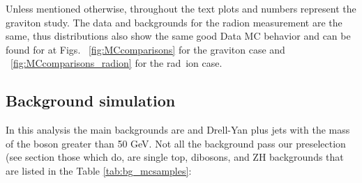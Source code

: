 Unless mentioned otherwise, throughout the text plots and numbers represent the graviton study. The data and backgrounds for the radion measurement are the same, thus distributions also show the same good Data MC behavior and can be found for at Figs. ~\ref{fig:MCcomparisons} for the graviton case and ~\ref{fig:MCcomparisons_radion} for the rad\
ion case.


\subsection{Background simulation\label{sec:bkgMC}}

In this analysis the main backgrounds are \ttbar and Drell-Yan plus
jets with the mass of the boson greater than 50 GeV. Not all the
background pass our preselection (see section %
those which do, are single top, dibosons, and ZH backgrounds that are
listed in the Table \ref{tab:bg_mcsamples}:

